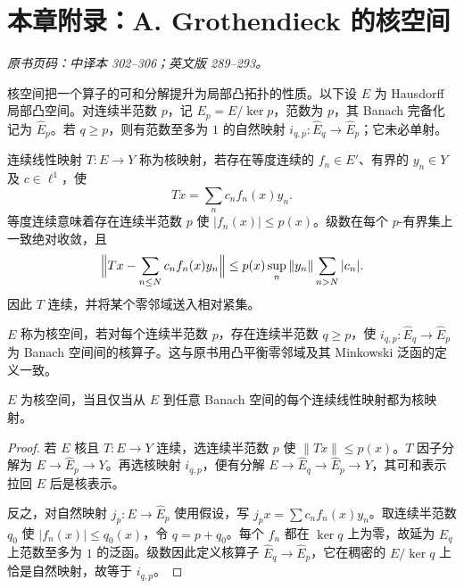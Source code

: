 \section*{本章附录：A. Grothendieck 的核空间}
\label{app:yosida-10}
\noindent\textit{原书页码：中译本 302--306；英文版 289--293。}

核空间把一个算子的可和分解提升为局部凸拓扑的性质。以下设 $E$ 为 Hausdorff 局部凸空间。对连续半范数 $p$，记 $E_p=E/\ker p$，范数为 $p$，其 Banach 完备化记为 $\widehat E_p$。若 $q\ge p$，则有范数至多为 $1$ 的自然映射 $i_{q,p}:\widehat E_q\to\widehat E_p$；它未必单射。

\begin{definition}
连续线性映射 $T:E\to Y$ 称为核映射，若存在等度连续的 $f_n\in E'$、有界的 $y_n\in Y$ 及 $c\in\ell^1$，使
\[
 Tx=\sum_n c_nf_n(x)y_n.
\]
等度连续意味着存在连续半范数 $p$ 使 $|f_n(x)|\le p(x)$。级数在每个 $p$-有界集上一致绝对收敛，且
\[
 \Bigl\|Tx-\sum_{n\le N}c_nf_n(x)y_n\Bigr\|
 \le p(x)\sup_n\|y_n\|\sum_{n>N}|c_n|.
\]
因此 $T$ 连续，并将某个零邻域送入相对紧集。
\end{definition}

\begin{definition}[核空间]\label{def:y10-nuclear-space}
$E$ 称为核空间，若对每个连续半范数 $p$，存在连续半范数 $q\ge p$，使 $i_{q,p}:\widehat E_q\to\widehat E_p$ 为 Banach 空间间的核算子。这与原书用凸平衡零邻域及其 Minkowski 泛函的定义一致。
\end{definition}

\begin{theorem}\label{thm:y10-nuclear-characterization}
$E$ 为核空间，当且仅当从 $E$ 到任意 Banach 空间的每个连续线性映射都为核映射。
\end{theorem}
\begin{proof}
若 $E$ 核且 $T:E\to Y$ 连续，选连续半范数 $p$ 使 $\|Tx\|\le p(x)$。$T$ 因子分解为 $E\to\widehat E_p\to Y$。再选核映射 $i_{q,p}$，便有分解 $E\to\widehat E_q\to\widehat E_p\to Y$，其可和表示拉回 $E$ 后是核表示。

反之，对自然映射 $j_p:E\to\widehat E_p$ 使用假设，写 $j_px=\sum c_nf_n(x)y_n$。取连续半范数 $q_0$ 使 $|f_n(x)|\le q_0(x)$，令 $q=p+q_0$。每个 $f_n$ 都在 $\ker q$ 上为零，故延为 $\widehat E_q$ 上范数至多为 $1$ 的泛函。级数因此定义核算子 $\widehat E_q\to\widehat E_p$，它在稠密的 $E/\ker q$ 上恰是自然映射，故等于 $i_{q,p}$。
\end{proof}

